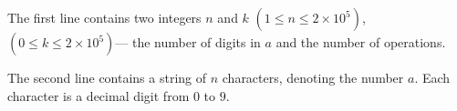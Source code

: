 The first line contains two integers $n$ and $k$ $(1\le n\le2\times10^5)$,$(0 \le k \le 2\times10^5)$--- the number of digits in $a$ and the number of operations.

The second line contains a string of $n$ characters, denoting the number $a$. Each character is a decimal digit from $0$ to $9$.